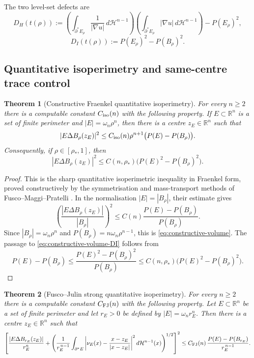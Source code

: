 \documentclass[11pt]{amsart}
\newtheorem{theorem}{Theorem}[section]
\theoremstyle{definition}
\newcommand{\R}{\mathbb R}
\newcommand{\rstar}{\rho_*}
\newcommand{\Hn}{\mathcal H^{n-1}}
\newcommand{\Per}{P}
\begin{document}
The two level-set defects are
\[
   D_H(t(\rho))
   :=\left(\int_{\partial^*E_\rho}\frac1{|\nabla u|}\,d\Hn\right)
     \left(\int_{\partial^*E_\rho}|\nabla u|\,d\Hn\right)
      -\Per(E_\rho)^2,
\]
\[
   D_I(t(\rho)):=\Per(E_\rho)^2-\Per(B_\rho)^2 .
\]

\subsection{Quantitative isoperimetry and same-centre trace control}
\label{sec:samecentre}

\begin{theorem}[Constructive Fraenkel quantitative isoperimetry]
\label{thm:constructive-fraenkel}
For every \(n\ge2\) there is a computable constant
\(C_{\rm iso}(n)\) with the following property.  If
\(E\subset\R^n\) is a set of finite perimeter and
\(|E|=\omega_n\rho^n\), then there is a centre \(z_E\in\R^n\) such that
\begin{equation}\label{eq:constructive-volume}
   |E\Delta B_\rho(z_E)|^2
   \le
   C_{\rm iso}(n)\rho^{n+1}\bigl(\Per(E)-\Per(B_\rho)\bigr).
\end{equation}
Consequently, if \(\rho\in[\rstar,1]\), then
\begin{equation}\label{eq:constructive-volume-DI}
   |E\Delta B_\rho(z_E)|^2
   \le C(n,\rstar)\bigl(\Per(E)^2-\Per(B_\rho)^2\bigr).
\end{equation}
\end{theorem}

\begin{proof}
This is the sharp quantitative isoperimetric inequality in Fraenkel form,
proved constructively by the symmetrisation and mass-transport methods of
Fusco--Maggi--Pratelli \cite{FMP}.  In the normalisation
\(|E|=|B_\rho|\), their estimate gives
\[
   \left(\frac{|E\Delta B_\rho(z_E)|}{|B_\rho|}\right)^2
   \le C(n)\frac{\Per(E)-\Per(B_\rho)}{\Per(B_\rho)} .
\]
Since \(|B_\rho|=\omega_n\rho^n\) and
\(\Per(B_\rho)=n\omega_n\rho^{n-1}\), this is
\eqref{eq:constructive-volume}.  The passage to
\eqref{eq:constructive-volume-DI} follows from
\[
   \Per(E)-\Per(B_\rho)
   \le \frac{\Per(E)^2-\Per(B_\rho)^2}{\Per(B_\rho)}
   \le C(n,\rstar)\bigl(\Per(E)^2-\Per(B_\rho)^2\bigr).
\]
\end{proof}

\begin{theorem}[Fusco--Julin strong quantitative isoperimetry]
\label{thm:FJ-strong}
For every \(n\ge2\) there is a computable constant \(C_{\rm FJ}(n)\) with the
following property.  Let \(E\subset\R^n\) be a set of finite perimeter and
let \(r_E>0\) be defined by \(|E|=\omega_n r_E^n\).  Then there is a
centre \(z_E\in\R^n\) such that
\begin{equation}\label{eq:FJ-exact}
   \left[
      \frac{|E\Delta B_{r_E}(z_E)|}{r_E^n}
      +
      \left(
         \frac1{r_E^{\,n-1}}
         \int_{\partial^*E}
            \left|\nu_E(x)-\frac{x-z_E}{|x-z_E|}\right|^2
         d\Hn(x)
      \right)^{1/2}
   \right]^2
   \le
   C_{\rm FJ}(n)\,
   \frac{\Per(E)-\Per(B_{r_E})}{r_E^{\,n-1}} .
\end{equation}
\end{theorem}
\end{document}

